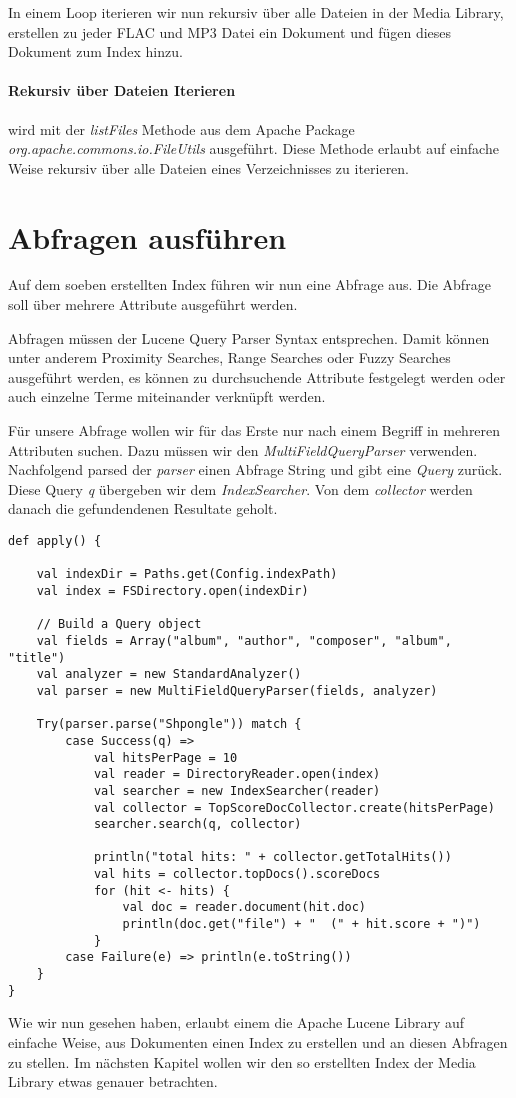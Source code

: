 In einem Loop iterieren wir nun rekursiv über alle
Dateien in der Media Library, erstellen zu jeder FLAC und MP3
Datei ein Dokument und fügen dieses Dokument zum Index
hinzu.

\paragraph{Rekursiv über Dateien Iterieren} wird mit der
\emph{listFiles} Methode aus dem Apache Package
\emph{org.apache.commons.io.FileUtils} ausgeführt.
Diese Methode erlaubt auf einfache Weise rekursiv
über alle Dateien eines Verzeichnisses zu iterieren.
\cite{web:fileutils}

\section{Abfragen ausführen}
Auf dem soeben erstellten Index führen wir nun eine Abfrage
aus. Die Abfrage soll über mehrere Attribute ausgeführt
werden.

Abfragen müssen der Lucene Query Parser Syntax entsprechen.
Damit können unter anderem Proximity Searches, Range Searches
oder Fuzzy Searches ausgeführt werden, es können
zu durchsuchende Attribute festgelegt werden oder
auch einzelne Terme
miteinander verknüpft werden. \cite{web:lucenesyntax}

Für unsere Abfrage wollen wir für das Erste nur 
nach einem Begriff in mehreren Attributen suchen.
Dazu müssen wir den \emph{MultiFieldQueryParser}
verwenden. Nachfolgend parsed der \emph{parser}
einen Abfrage String und gibt eine \emph{Query}
zurück. Diese Query \emph{q} übergeben wir dem
\emph{IndexSearcher}. Von dem \emph{collector}
werden danach die gefundendenen Resultate geholt.
\cite{web:lucenedoc,web:luceneintro}

\begin{lstlisting}[style=myScalastyle]
def apply() {
    
    val indexDir = Paths.get(Config.indexPath)
    val index = FSDirectory.open(indexDir)

    // Build a Query object
    val fields = Array("album", "author", "composer", "album", "title")
    val analyzer = new StandardAnalyzer()
    val parser = new MultiFieldQueryParser(fields, analyzer)

    Try(parser.parse("Shpongle")) match {
        case Success(q) => 
            val hitsPerPage = 10
            val reader = DirectoryReader.open(index)
            val searcher = new IndexSearcher(reader)
            val collector = TopScoreDocCollector.create(hitsPerPage)
            searcher.search(q, collector)
            
            println("total hits: " + collector.getTotalHits())
            val hits = collector.topDocs().scoreDocs
            for (hit <- hits) {
                val doc = reader.document(hit.doc)
                println(doc.get("file") + "  (" + hit.score + ")")
            }
        case Failure(e) => println(e.toString())
    }       
}
\end{lstlisting}

Wie wir nun gesehen haben, erlaubt einem die Apache
Lucene Library auf einfache Weise, aus Dokumenten
einen Index zu erstellen und an diesen Abfragen zu
stellen. Im nächsten Kapitel wollen wir den so erstellten
Index der Media Library etwas genauer betrachten.
